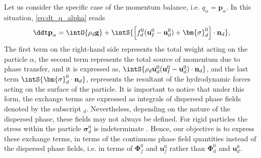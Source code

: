 Let us consider the specific case of the momentum balance, i.e. $q_\alpha = \textbf{p}_\alpha$.
In this situation, \ref{eq:dt_q_alpha} reads
\begin{equation}
    \ddt  \textbf{p}_\alpha
    = \intO{ \rho_d\textbf{g} }
    + \intS{ 
        \left[
        f_d^0 (\textbf{u}_I^0-\textbf{u}_d^0)
         + \bm{\sigma}_d^0%
        \right] 
        \cdot \textbf{n}_d },
\end{equation}
The first term on the right-hand side represents the total weight acting on the particle $\alpha$, 
the second term represents the total source of momentum due to phase transfer, and it is expressed as, $\intS{ \rho_d \textbf{u}_d^0 (\textbf{u}_I^0-\textbf{u}_d^0)\cdot\textbf{n}_d }$,
and the last term $\intS{ \bm{\sigma}_d^0\cdot\textbf{n}_d }$, represents the resultant of the hydrodynamic forces acting on the surface of the particle.
It is important to notice that under this form, the exchange terms are expressed as integrals of dispersed phase fields denoted by the subscript $_d$.
Nevertheless, depending on the nature of the dispersed phase, these fields may not always be defined.
For rigid particles the stress within the particle $\bm{\sigma}_d^0$ is indeterminate \citep{guazzelli2011}.  
Hence, our objective is to express these exchange terms, in terms of the continuous phase field quantities instead of the dispersed phase fields, i.e. in terms of $\mathbf{\Phi}_f^0$ and $\textbf{u}_f^0$ rather than $\mathbf{\Phi}_d^0$ and $\textbf{u}_d^0$. 

 

